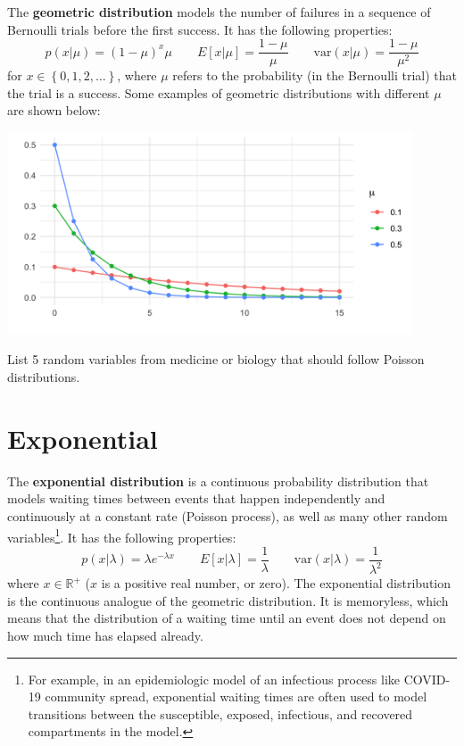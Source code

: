 The \textbf{geometric distribution} models the number of failures in a sequence of Bernoulli trials before the first success. It has the following properties:
$$ p(x|\mu) = (1-\mu)^x \mu \qquad E[x|\mu] = \frac{1-\mu}{\mu} \qquad \text{var}(x|\mu) = \frac{1-\mu}{\mu^2}  $$
for $x \in \left\{0, 1, 2, \dots \right\}$, where $\mu$ refers to the probability (in the Bernoulli trial) that the trial is a success. Some examples of geometric distributions with different $\mu$ are shown below: 
\begin{center}
\includegraphics[width=0.9\textwidth]{img/l01-figure4-geometric-mu-change.png}
\end{center}

\begin{question}{}
List 5 random variables from medicine or biology that should follow Poisson distributions.
\end{question}


\section{Exponential}

The \textbf{exponential distribution} is a continuous probability distribution that models waiting times between events that happen independently and continuously at a constant rate (Poisson process), as well as many other random variables\footnote{For example, in an epidemiologic model of an infectious process like COVID-19 community spread, exponential waiting times are often used to model transitions between the susceptible, exposed, infectious, and recovered compartments in the model.}. It has the following properties:
$$ p(x|\lambda) = \lambda e^{-\lambda x} \qquad E[x|\lambda] = \frac{1}{\lambda} \qquad \text{var}(x|\lambda) = \frac{1}{\lambda^2} $$
where $x \in \mathbb{R}^+$ ($x$ is a positive real number, or zero). The exponential distribution is the continuous analogue of the geometric distribution. It is memoryless, which means that the distribution of a waiting time until an event does not depend on how much time has elapsed already.

